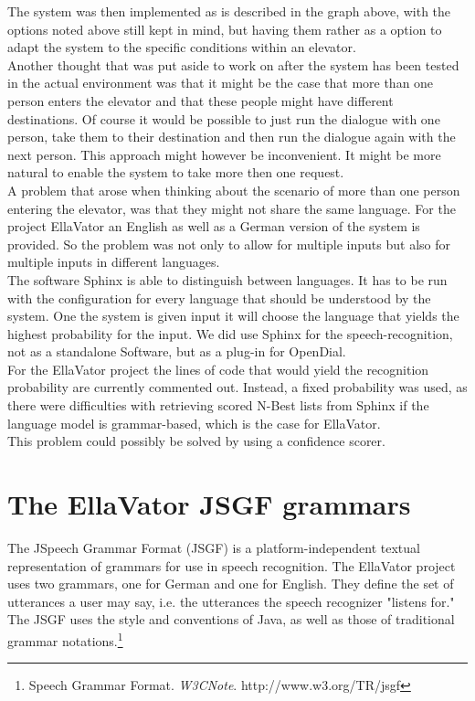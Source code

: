 \documentclass[a4paper, 12pt]{article}
\begin{document}
The system was then implemented as is described in the graph above, with the options noted above still kept in mind, but having them rather as a option to adapt the system to the specific conditions within an elevator.\\

Another thought that was put aside to work on after the system has been tested in the actual environment was that it might be the case that more than one person enters the elevator and that these people might have different destinations.
Of course it would be possible to just run the dialogue with one person, take them to their destination and then run the dialogue again with the next person.
This approach might however be inconvenient.
It might be more natural to enable the system to take more then one request.\\


A problem that arose when thinking about the scenario of more than one person entering the elevator, was that they might not share the same language.
For the project EllaVator an English as well as a German version of the system is provided.
So the problem was not only to allow for multiple inputs but also for multiple inputs in different languages.\\
The software Sphinx is able to distinguish between languages. 
It has to be run with the configuration for every language that should be understood by the system.
One the system is given input it will choose the language that yields the highest probability for the input.
We did use Sphinx for the speech-recognition, not as a standalone Software, but as a plug-in for OpenDial.\\
\newline
For the EllaVator project the lines of code that would yield the recognition probability are currently commented out.
Instead, a fixed probability was used, as there were difficulties with retrieving scored N-Best lists from Sphinx if the language model is grammar-based, which is the case for EllaVator.\\
This problem could possibly be solved by using a confidence scorer.




\newpage
\section{The EllaVator JSGF grammars}
The JSpeech Grammar Format (JSGF) is a platform-independent textual representation of grammars for use in speech recognition.
The EllaVator project uses two grammars, one for German and one for English.
They define the set of utterances a user may say, i.e. the utterances the speech recognizer "listens for."
The JSGF uses the style and conventions of Java, as well as those of traditional grammar notations.\footnote{ Speech Grammar Format. \textit{W3CNote}. http://www.w3.org/TR/jsgf}
\end{document}

